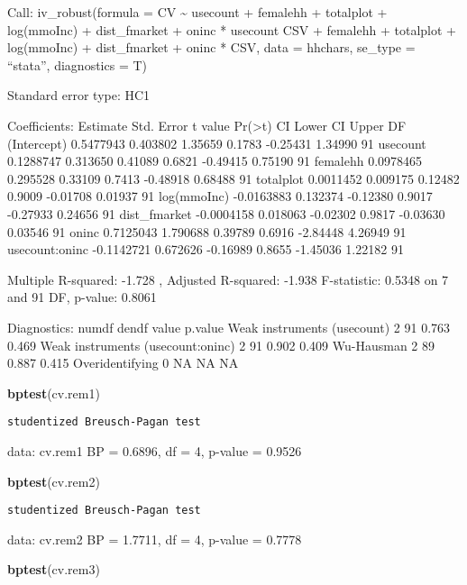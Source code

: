 \documentclass[
]{article}
\newenvironment{Shaded}{\begin{snugshade}}{\end{snugshade}}
\newcommand{\KeywordTok}[1]{\textcolor[rgb]{0.13,0.29,0.53}{\textbf{#1}}}
\newcommand{\NormalTok}[1]{#1}
\begin{document}
Call: iv\_robust(formula = CV \textasciitilde{} usecount + femalehh +
totalplot + log(mmoInc) + dist\_fmarket + oninc * usecount \textbar{}
CSV + femalehh + totalplot + log(mmoInc) + dist\_fmarket + oninc * CSV,
data = hhchars, se\_type = ``stata'', diagnostics = T)

Standard error type: HC1

Coefficients: Estimate Std. Error t value
Pr(\textgreater\textbar t\textbar) CI Lower CI Upper DF (Intercept)
0.5477943 0.403802 1.35659 0.1783 -0.25431 1.34990 91 usecount 0.1288747
0.313650 0.41089 0.6821 -0.49415 0.75190 91 femalehh 0.0978465 0.295528
0.33109 0.7413 -0.48918 0.68488 91 totalplot 0.0011452 0.009175 0.12482
0.9009 -0.01708 0.01937 91 log(mmoInc) -0.0163883 0.132374 -0.12380
0.9017 -0.27933 0.24656 91 dist\_fmarket -0.0004158 0.018063 -0.02302
0.9817 -0.03630 0.03546 91 oninc 0.7125043 1.790688 0.39789 0.6916
-2.84448 4.26949 91 usecount:oninc -0.1142721 0.672626 -0.16989 0.8655
-1.45036 1.22182 91

Multiple R-squared: -1.728 , Adjusted R-squared: -1.938 F-statistic:
0.5348 on 7 and 91 DF, p-value: 0.8061

Diagnostics: numdf dendf value p.value Weak instruments (usecount) 2 91
0.763 0.469 Weak instruments (usecount:oninc) 2 91 0.902 0.409
Wu-Hausman 2 89 0.887 0.415 Overidentifying 0 NA NA NA

\begin{Shaded}
\begin{Highlighting}[]
\KeywordTok{bptest}\NormalTok{(cv.rem1)}
\end{Highlighting}
\end{Shaded}

\begin{verbatim}
studentized Breusch-Pagan test
\end{verbatim}

data: cv.rem1 BP = 0.6896, df = 4, p-value = 0.9526

\begin{Shaded}
\begin{Highlighting}[]
\KeywordTok{bptest}\NormalTok{(cv.rem2)}
\end{Highlighting}
\end{Shaded}

\begin{verbatim}
studentized Breusch-Pagan test
\end{verbatim}

data: cv.rem2 BP = 1.7711, df = 4, p-value = 0.7778

\begin{Shaded}
\begin{Highlighting}[]
\KeywordTok{bptest}\NormalTok{(cv.rem3)}
\end{Highlighting}
\end{Shaded}
\end{document}
